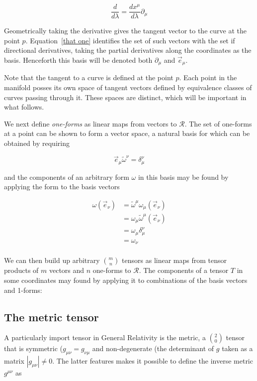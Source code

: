 \begin{equation}
\frac{d}{d\lambda} = \frac{dx^\mu}{d\lambda} \partial_\mu
\end{equation}

Geometrically taking the derivative gives the tangent vector to the
curve at the point $p$.  Equation~\ref{that one} identifies the set of
such vectors with the set if directional derivatives, taking the
partial derivatives along the coordinates as the basis.  Henceforth
this basis will be denoted both $\partial_\mu$ and $\vec{e}_\mu$.

Note that the tangent to a curve is defined at the point $p$.  Each
point in the manifold posses its own space of tangent vectors defined
by equivalence classes of curves passing through it.  These spaces are 
distinct, which will be important in what follows.

We next define \emph{one-forms} as linear maps from vectors to
$\mathcal{R}$.  The set of one-forms at a point can be shown to form a
vector space, a natural basis for which can be obtained by requiring

\begin{equation*}
\vec{e}_\mu \tilde{\omega}^\nu = \delta_\mu^\nu
\end{equation*}

and the components of an arbitrary form $\omega$ in this basis may be
found by applying the form to the basis vectors

\begin{align*}
\omega(\vec{e}_\nu)
&= \tilde{\omega}^\mu \omega_\mu (\vec{e}_\nu) \\
&= \omega_\mu \tilde{\omega}^\mu (\vec{e}_\nu) \\
&= \omega_\mu \delta^\nu_\mu \\
&= \omega_\nu\\
\end{align*}

We can then build up arbitrary ${m \choose n}$ tensors as linear maps
from tensor products of $m$ vectors and $n$ one-forms to
$\mathcal{R}$.  The components of a tensor $T$ in some coordinates may
found by applying it to combinations of the basis vectors and 1-forms:


\subsection{The metric tensor}

A particularly import tensor in General Relativity is the metric, a
${2 \choose 0}$ tensor that is symmetric ($g_{\mu\nu} = g_{\nu\mu}$
and non-degenerate (the determinant of $g$ taken as a matrix 
$|g_{\mu\nu}| \neq 0$.  The latter features makes it possible to
define the inverse metric $g^{\mu\nu}$ as

